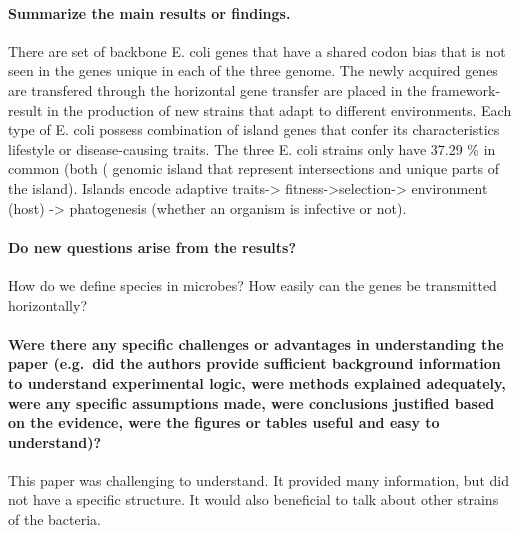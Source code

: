 \documentclass[]{article}
\let\oldparagraph\paragraph
\renewcommand{\paragraph}[1]{\oldparagraph{#1}\mbox{}}
\begin{document}
\paragraph{Summarize the main results or
findings.}\label{summarize-the-main-results-or-findings.-3}

There are set of backbone E. coli genes that have a shared codon bias
that is not seen in the genes unique in each of the three genome. The
newly acquired genes are transfered through the horizontal gene transfer
are placed in the framework- result in the production of new strains
that adapt to different environments. Each type of E. coli possess
combination of island genes that confer its characteristics lifestyle or
disease-causing traits. The three E. coli strains only have 37.29 \% in
common (both ( genomic island that represent intersections and unique
parts of the island). Islands encode adaptive traits-\textgreater{}
fitness-\textgreater{}selection-\textgreater{} environment (host)
-\textgreater{} phatogenesis (whether an organism is infective or not).

\paragraph{Do new questions arise from the
results?}\label{do-new-questions-arise-from-the-results-3}

How do we define species in microbes? How easily can the genes be
transmitted horizontally?

\paragraph{Were there any specific challenges or advantages in
understanding the paper (e.g.~did the authors provide sufficient
background information to understand experimental logic, were methods
explained adequately, were any specific assumptions made, were
conclusions justified based on the evidence, were the figures or tables
useful and easy to
understand)?}\label{were-there-any-specific-challenges-or-advantages-in-understanding-the-paper-e.g.did-the-authors-provide-sufficient-background-information-to-understand-experimental-logic-were-methods-explained-adequately-were-any-specific-assumptions-made-were-conclusions-justified-based-on-the-evidence-were-the-figures-or-tables-useful-and-easy-to-understand-3}

This paper was challenging to understand. It provided many information,
but did not have a specific structure. It would also beneficial to talk
about other strains of the bacteria.
\end{document}
